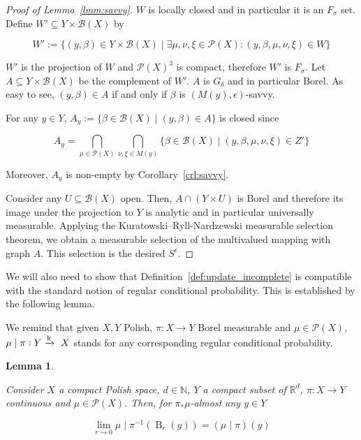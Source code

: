 \documentclass[11pt]{article}
\theoremstyle{definition}
\theoremstyle{plain}
\newtheorem{lemma}{Lemma}%
\newcommand{\Nats}{\mathbb{N}}
\newcommand{\Reals}{\mathbb{R}}
\newcommand{\B}{\operatorname{B}}
\newcommand{\M}{\xrightarrow{\textnormal{k}}}
\newcommand{\PM}{\mathcal{P}}
\newcommand{\Gm}{\mathcal{B}}
\begin{document}
\begin{proof}[Proof of Lemma~\ref{lmm:savvy}]
$W$ is locally closed and in particular it is an $F_\sigma$ set. Define $W' \subseteq Y \times \Gm\left(X\right)$ by

$$W':=\{\left(y,\beta\right) \in Y \times \Gm\left(X\right) \mid \exists \mu,\nu,\xi \in \PM\left(X\right): \left(y,\beta,\mu,\nu,\xi\right) \in W\}$$

$W'$ is the projection of $W$ and $\PM\left(X\right)^3$ is compact, therefore $W'$ is $F_\sigma$. Let $A \subseteq Y \times \Gm\left(X\right)$ be the complement of $W'$. $A$ is $G_\delta$ and in particular Borel. As easy to see, $\left(y,\beta\right) \in A$ if and only if $\beta$ is $\left(M\left(y\right),\epsilon\right)$-savvy.

For any $y \in Y$, $A_y:=\{\beta \in \Gm\left(X\right) \mid \left(y,\beta\right) \in A\}$ is closed since

$$A_y = \bigcap_{\mu \in \PM\left(X\right)} \bigcap_{\nu,\xi \in M\left(y\right)} \{\beta \in \Gm\left(X\right) \mid \left(y,\beta,\mu,\nu,\xi\right) \in Z'\}$$

Moreover, $A_y$ is non-empty by Corollary~\ref{crl:savvy}.

Consider any $U \subseteq \Gm\left(X\right)$ open. Then, $A \cap \left(Y \times U\right)$ is Borel and therefore its image under the projection to $Y$ is analytic and in particular universally measurable. Applying the Kuratowski--Ryll-Nardzewski measurable selection theorem, we obtain a measurable selection of the multivalued mapping with graph $A$. This selection is the desired $S^\epsilon$.
\end{proof}

We will also need to show that Definition~\ref{def:update_incomplete} is compatible with the standard notion of regular conditional probability. This is established by the following lemma.

We remind that given $X,Y$ Polish, $\pi: X \rightarrow Y$ Borel measurable and $\mu \in \PM\left(X\right)$, $\mu \mid \pi: Y \M\ X$ stands for any corresponding regular conditional probability.

\begin{samepage}
\begin{lemma}
\label{lmm:update_incomplete}

Consider $X$ a compact Polish space, $d \in \Nats$, $Y$ a compact subset of $\Reals^d$, $\pi: X \rightarrow Y$ continuous and $\mu \in \PM\left(X\right)$. Then, for $\pi_*\mu$-almost any $y \in Y$

\begin{equation}
\lim_{r \rightarrow 0}{\mu \mid \pi^{-1}\left(\B_r\left(y\right)\right) = \left(\mu \mid \pi\right)\left(y\right)}
\end{equation}

\end{lemma}
\end{samepage}
\end{document}
